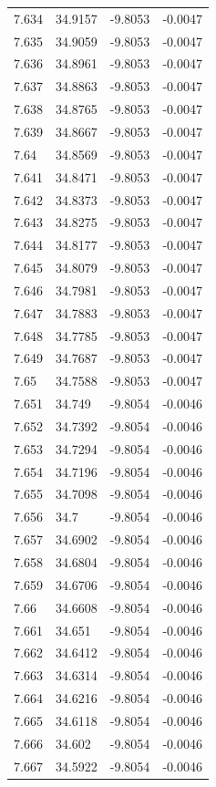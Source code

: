 \begin{tabular}{llll}
7.634 & 34.9157 & -9.8053 & -0.0047 \\
7.635 & 34.9059 & -9.8053 & -0.0047 \\
7.636 & 34.8961 & -9.8053 & -0.0047 \\
7.637 & 34.8863 & -9.8053 & -0.0047 \\
7.638 & 34.8765 & -9.8053 & -0.0047 \\
7.639 & 34.8667 & -9.8053 & -0.0047 \\
7.64 & 34.8569 & -9.8053 & -0.0047 \\
7.641 & 34.8471 & -9.8053 & -0.0047 \\
7.642 & 34.8373 & -9.8053 & -0.0047 \\
7.643 & 34.8275 & -9.8053 & -0.0047 \\
7.644 & 34.8177 & -9.8053 & -0.0047 \\
7.645 & 34.8079 & -9.8053 & -0.0047 \\
7.646 & 34.7981 & -9.8053 & -0.0047 \\
7.647 & 34.7883 & -9.8053 & -0.0047 \\
7.648 & 34.7785 & -9.8053 & -0.0047 \\
7.649 & 34.7687 & -9.8053 & -0.0047 \\
7.65 & 34.7588 & -9.8053 & -0.0047 \\
7.651 & 34.749 & -9.8054 & -0.0046 \\
7.652 & 34.7392 & -9.8054 & -0.0046 \\
7.653 & 34.7294 & -9.8054 & -0.0046 \\
7.654 & 34.7196 & -9.8054 & -0.0046 \\
7.655 & 34.7098 & -9.8054 & -0.0046 \\
7.656 & 34.7 & -9.8054 & -0.0046 \\
7.657 & 34.6902 & -9.8054 & -0.0046 \\
7.658 & 34.6804 & -9.8054 & -0.0046 \\
7.659 & 34.6706 & -9.8054 & -0.0046 \\
7.66 & 34.6608 & -9.8054 & -0.0046 \\
7.661 & 34.651 & -9.8054 & -0.0046 \\
7.662 & 34.6412 & -9.8054 & -0.0046 \\
7.663 & 34.6314 & -9.8054 & -0.0046 \\
7.664 & 34.6216 & -9.8054 & -0.0046 \\
7.665 & 34.6118 & -9.8054 & -0.0046 \\
7.666 & 34.602 & -9.8054 & -0.0046 \\
7.667 & 34.5922 & -9.8054 & -0.0046 \\

\end{tabular}
